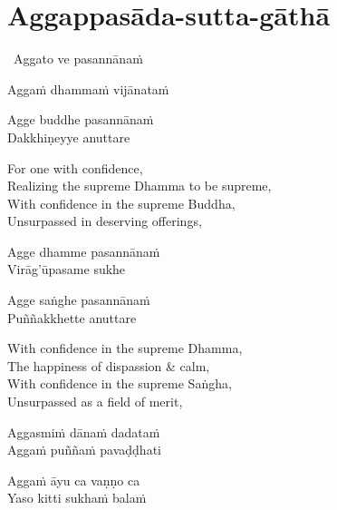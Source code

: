 \suttaRef{[MJG]}

\section{Aggappasāda-sutta-gāthā}
\label{aggappasada-sutta-gatha}

\begin{pali-leader}
  \anglebracketleft\ \hspace{-0.5mm}Aggato ve pasannānaṁ \hspace{-0.5mm}\anglebracketright\
\end{pali-leader}
\begin{pali-hangtogether}
  Aggaṁ dhammaṁ vijānataṁ
\end{pali-hangtogether}
\begin{pali-hangtogether}
  Agge buddhe pasannānaṁ\\
  Dakkhiṇeyye anuttare
\end{pali-hangtogether}

\begin{english-verses}
  For one with confidence,\\
  Realizing the supreme Dhamma to be supreme,\\
  With confidence in the supreme Buddha,\\
  Unsurpassed in deserving offerings,
\end{english-verses}

\begin{pali-hang}
  Agge dhamme pasannānaṁ\\
  Virāg'ūpasame sukhe
\end{pali-hang}
\begin{pali-hangtogether}
  Agge saṅghe pasannānaṁ\\
  Puññakkhette anuttare
\end{pali-hangtogether}

\begin{english-verses}
  With confidence in the supreme Dhamma,\\
  The happiness of dispassion \& calm,\\
  With confidence in the supreme Saṅgha,\\
  Unsurpassed as a field of merit,
\end{english-verses}

\begin{pali-hang}
  Aggasmiṁ dānaṁ dadataṁ\\
  Aggaṁ puññaṁ pavaḍḍhati
\end{pali-hang}
\begin{pali-hangtogether}
  Aggaṁ āyu ca vaṇṇo ca\\
  Yaso kitti sukhaṁ balaṁ
\end{pali-hangtogether}


